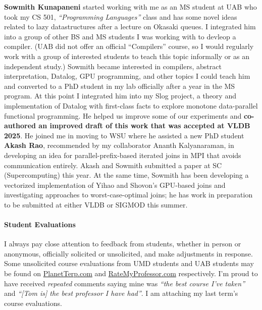 \documentclass[12pt]{article}
\begin{document}
\textbf{Sowmith Kunapaneni} started working with me as an MS student at UAB who took my CS 501, \emph{``Programming Languages''} class and has some novel ideas related to lazy datastructures after a lecture on Okasaki queues. I integrated him into a group of other BS and MS students I was working with to devleop a compiler. (UAB did not offer an official ``Compilers'' course, so I would regularly work with a group of interested students to teach this topic informally or as an independent study.) Sowmith became interested in compilers, abstract interpretation, Datalog, GPU programming, and other topics I could teach him and converted to a PhD student in my lab officially after a year in the MS program. At this point I integrated him into my Slog project, a theory and implementation of Datalog with first-class facts to explore monotone data-parallel functional programming. He helped us improve some of our experiments and \textbf{co-authored an improved draft of this work that was accepted at VLDB 2025}. He joined me in moving to WSU where he assisted a new PhD student \textbf{Akash Rao}, recommended by my collaborator Ananth Kalyanaraman, in developing an idea for parallel-prefix-based iterated joins in MPI that avoids communication entirely. Akash and Sowmith submitted a paper at SC (Supercomputing) this year. At the same time, Sowmith has been developing a vectorized implementation of Yihao and Shovon's GPU-based joins and investigating approaches to worst-case-optimal joins; he has work in preparation to be submitted at either VLDB or SIGMOD this summer.


\paragraph{Student Evaluations}

I always pay close attention to feedback from students, whether in person or anonymous, officially solicited or unsolicited, and make adjustments in response. Some unsolicited course evaluations from UMD students and UAB students may be found on \href{https://planetterp.com/professor/gilray}{PlanetTerp.com} and \href{https://www.ratemyprofessors.com/professor/2399194}{RateMyProfessor.com} respectively. I'm proud to have received \emph{repeated} comments saying mine was \emph{``the best course I've taken''} and \emph{``[Tom is] the best professor I have had''}.  I am attaching my last term's course evaluations.
\end{document}
